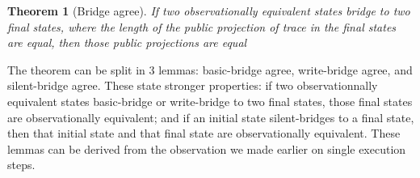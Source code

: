 \documentclass[10pt]{article}
\newcommand{\pc}{\mathrm{pc}}
\newcommand{\ctx}{\Gamma}
\newcommand{\typing}[4]{ #1,~#2 \vdash #3 \rightsquigarrow #4}
\newcommand{\bridge}[3] { #1 \curvearrowright_{#2} #3 }
\newcommand{\pproj}[1]{\llbracket #1 \rrbracket_{p}}
\newcommand{\agree}[3]{#2 \sim_{#1} #3}
\newtheorem{theorem}{Theorem}
\begin{document}
\begin{theorem}[Bridge agree]\label{thm:agree}
  If two observationally equivalent states bridge to two final states, where the length of the public projection of trace in the final states are equal, then those public projections are equal
  

\end{theorem}

The theorem can be split in 3 lemmas: basic-bridge agree, write-bridge agree, and silent-bridge
agree. These state stronger properties: if two observationnally equivalent states basic-bridge or write-bridge to two final states, those final states are observationally equivalent; and if an initial state silent-bridges to a final state, then that initial state and that final state are observationally equivalent. These lemmas can be derived from the observation we made earlier on single execution steps.


\end{document}
